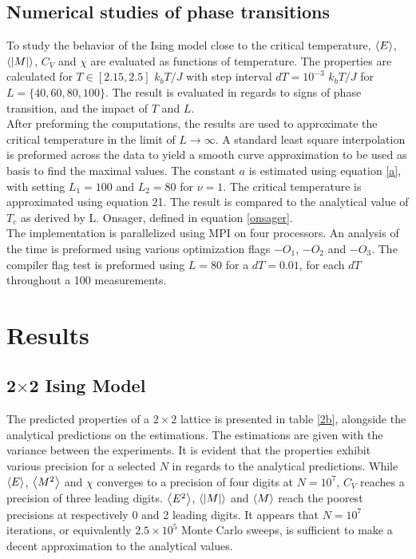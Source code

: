 \documentclass[%
reprint,nofootinbib,
amsmath,amssymb,
aps,
]{revtex4-1}
\begin{document}
\subsection{Numerical studies of phase transitions} \noindent 
To study the behavior of the Ising model close to the critical temperature, $\expval{E}$, $\expval{\abs{M}}$, $C_V$ and $\chi$ are evaluated as functions of temperature. The properties are calculated for $T\in[2.15,2.5]$ $k_bT/J$ with step interval $dT = 10^{-3}$ $k_bT/J$ for $L = \{40, 60, 80, 100\}$. The result is evaluated in regards to signs of phase transition, and the impact of $T$ and $L$. \\ \indent 
After preforming the computations, the results are used to approximate the critical temperature in the limit of $L\rightarrow \infty$. A standard least square interpolation is preformed across the data to yield a smooth curve approximation to be used as basis to find the maximal values. The constant $a$ is estimated using equation \ref{a}, with setting $L_1 = 100$ and $L_2 = 80$ for $\nu = 1$. The critical temperature is approximated using equation 21. The result is compared to the analytical value of $T_c$ as derived by L. Onsager, defined in equation \ref{onsager}. \\ \indent 
The implementation is parallelized using MPI on four processors. An analysis of the time is preformed using various optimization flags $-O_1$, $-O_2$ and $-O_3$. The compiler flag test is preformed using $L = 80$ for a $dT = 0.01$, for each $dT$ throughout a 100 measurements. \\
 
\newpage 
\onecolumngrid
\section{Results} 

\twocolumngrid

\subsection*{2$\times$2 Ising Model}\noindent 
The predicted properties of a $2\times 2$ lattice is presented in table \ref{2b}, alongside the analytical predictions on the estimations. The estimations are given with the variance between the experiments. It is evident that the properties exhibit various precision for a selected $N$ in regards to the analytical predictions. While $\expval{E}$, $\expval{M^2}$ and $\chi$ converges to a precision of four digits at $N=10^7$, $C_V$ reaches a precision of three leading digits. $\expval{E^2}$, $\expval{\abs{M}}$ and  $\expval{M} $ reach the poorest precisions at respectively 0 and 2 leading digits. It appears that $N=10^7$ iterations, or equivalently $2.5\times10^5$ Monte Carlo sweeps, is sufficient to make a decent approximation to the analytical values. \newpage
\end{document}

